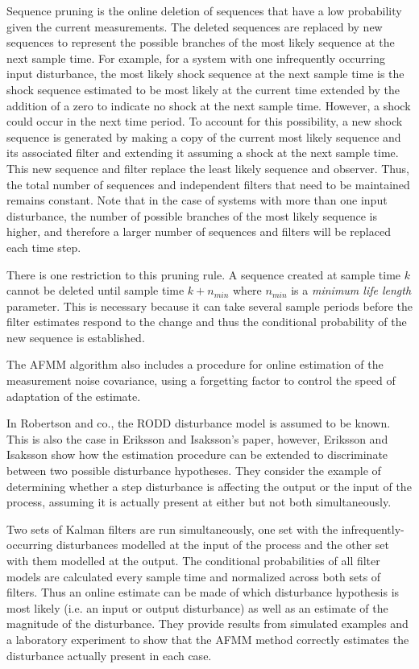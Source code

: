 Sequence pruning is the online deletion of sequences that have a low probability given the current measurements. The deleted sequences are replaced by new sequences to represent the possible branches of the most likely sequence at the next sample time. For example, for a system with one infrequently occurring input disturbance, the most likely shock sequence at the next sample time is the shock sequence estimated to be most likely at the current time extended by the addition of a zero to indicate no shock at the next sample time. However, a shock could occur in the next time period. To account for this possibility, a new shock sequence is generated by making a copy of the current most likely sequence and its associated filter and extending it assuming a shock at the next sample time. This new sequence and filter replace the least likely sequence and observer. Thus, the total number of sequences and independent filters that need to be maintained remains constant. Note that in the case of systems with more than one input disturbance, the number of possible branches of the most likely sequence is higher, and therefore a larger number of sequences and filters will be replaced each time step.

There is one restriction to this pruning rule. A sequence created at sample time $k$ cannot be deleted until sample time $k+n_{min}$ where $n_{min}$ is a \textit{minimum life length} parameter. This is necessary because it can take several sample periods before the filter estimates respond to the change and thus the conditional probability of the new sequence is established.

The AFMM algorithm also includes a procedure for online estimation of the measurement noise covariance, using a forgetting factor to control the speed of adaptation of the estimate.\cite{andersson_adaptive_1985}

In Robertson and co., the RODD disturbance model is assumed to be known. This is also the case in Eriksson and Isaksson's paper, however, Eriksson and Isaksson show how the estimation procedure can be extended to discriminate between two possible disturbance hypotheses. They consider the example of determining whether a step disturbance is affecting the output or the input of the process, assuming it is actually present at either but not both simultaneously.

Two sets of Kalman filters are run simultaneously, one set with the infrequently-occurring disturbances modelled at the input of the process and the other set with them modelled at the output. The conditional probabilities of all filter models are calculated every sample time and normalized across both sets of filters.  Thus an online estimate can be made of which disturbance hypothesis is most likely (i.e. an input or output disturbance) as well as an estimate of the magnitude of the disturbance. They provide results from simulated examples and a laboratory experiment to show that the AFMM method correctly estimates the disturbance actually present in each case.

